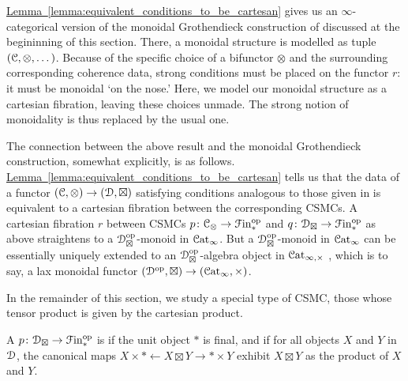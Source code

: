 \documentclass[main.tex]{subfiles}
\begin{document}
\begin{note}
  \hyperref[lemma:equivalent_conditions_to_be_cartesan]{Lemma~\ref*{lemma:equivalent_conditions_to_be_cartesan}} gives us an $\infty$-categorical version of the monoidal Grothendieck construction of \cite{moeller2018monoidal} discussed at the begininning of this section. There, a monoidal structure is modelled as tuple $(\mathcal{C}, \otimes, \dots)$. Because of the specific choice of a bifunctor $\otimes$ and the surrounding corresponding coherence data, strong conditions must be placed on the functor $r$: it must be monoidal `on the nose.' Here, we model our monoidal structure as a cartesian fibration, leaving these choices unmade. The strong notion of monoidality is thus replaced by the usual one.

  The connection between the above result and the monoidal Grothendieck construction, somewhat explicitly, is as follows. \hyperref[lemma:equivalent_conditions_to_be_cartesan]{Lemma~\ref*{lemma:equivalent_conditions_to_be_cartesan}} tells us that the data of a functor $(\mathcal{C}, \otimes) \to (\mathcal{D}, \boxtimes)$ satisfying conditions analogous to those given in \cite{moeller2018monoidal} is equivalent to a cartesian fibration between the corresponding CSMCs. A cartesian fibration $r$ between CSMCs $p\colon \mathcal{C}_{\otimes} \to \mathcal{F}\mathrm{in}_{*}^{\mathrm{op}}$ and $q\colon \mathcal{D}_{\boxtimes} \to \mathcal{F}\mathrm{in}_{*}^{\mathrm{op}}$ as above straightens to a $\mathcal{D}_{\boxtimes}^{\mathrm{op}}$-monoid in $\mathcal{C}\mathrm{at}_{\infty}$. But a $\mathcal{D}_{\boxtimes}^{\mathrm{op}}$-monoid in $\mathcal{C}\mathrm{at}_{\infty}$ can be essentially uniquely extended to an $\mathcal{D}_{\boxtimes}^{\mathrm{op}}$-algebra object in $\mathcal{C}\mathrm{at}_{\infty,\times}$ \cite[Prop~2.4.2.4--2.4.2.6]{luriehigheralgebra}, which is to say, a lax monoidal functor $(\mathcal{D}^{\mathrm{op}}, \boxtimes) \to (\mathcal{C}\mathrm{at}_{\infty}, \times)$.
\end{note}

In the remainder of this section, we study a special type of CSMC, those whose tensor product is given by the cartesian product.

\begin{definition}
  A  $p\colon \mathcal{D}_{\boxtimes} \to \mathcal{F}\mathrm{in}_{*}^{\mathrm{op}}$ is  if the unit object $\ast$ is final, and if for all objects $X$ and $Y$ in $\mathcal{D}$, the canonical maps $X \times \ast \leftarrow X \boxtimes Y \to \ast \times Y$ exhibit $X \boxtimes Y$ as the product of $X$ and $Y$.
\end{definition}
\end{document}
